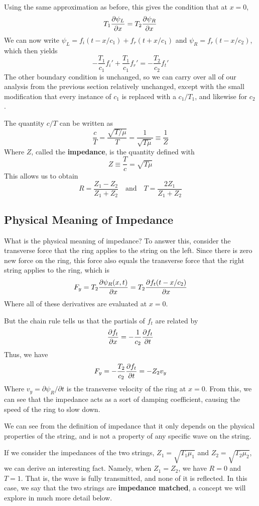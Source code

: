 Using the same approximation as before, this gives the condition that at $x=0$,
\[ T_1\pdv{\psi_L}{x} = T_2\pdv{\psi_R}{x} \]
We can now write $\psi_L = f_i(t - x/c_1) + f_r(t + x/c_1)$ and $\psi_R = f_r(t - x/c_2)$, which then yields
\[ -\frac{T_1}{c_1} f_i' + \frac{T_1}{c_1}f_r' = -\frac{T_2}{c_2}f_t'\]
The other boundary condition is unchanged, so we can carry over all of our analysis from the previous section relatively unchanged, except with the small modification that every instance of $c_1$ is replaced with a $c_1/T_1$, and likewise for $c_2$.

The quantity $c/T$ can be written as 
\[ \frac{c}{T} = \frac{\sqrt{T/\mu }}{T} = \frac{1}{\sqrt{T\mu}} \equiv \frac{1}{Z}\]
Where $Z$, called the \textbf{impedance}, is the quantity defined with
\[ Z \equiv \frac{T}{c} = \sqrt{T\mu} \]
This allows us to obtain
\[ R = \frac{Z_1-Z_2}{Z_1+Z_2} \quad\text{and}\quad T = \frac{2Z_1}{Z_1+Z_2}\]
\subsection*{Physical Meaning of Impedance}
What is the physical meaning of impedance? To answer this, consider the transverse force that the ring applies to the string on the left. Since there is zero new force on the ring, this force also equals the transverse force that the right string applies to the ring, which is
\[ F_y = T_2 \pdv{\psi_R(x,t)}{x} = T_2\pdv{f_t(t-x/c_2)}{x} \]
Where all of these derivatives are evaluated at $x=0$.

But the chain rule tells us that the partials of $f_t$ are related by
\[ \pdv{f_t}{x} = -\frac{1}{c_2} \pdv{f_t}{t} \]
Thus, we have
\[ F_y = -\frac{T_2}{c_2} \pdv{f_t}{t} = -Z_2v_y\]
Where $v_y = \partial \psi_R/\partial t$ is the transverse velocity of the ring at $x=0$. From this, we can see that the impedance acts as a sort of damping coefficient, causing the speed of the ring to slow down.

We can see from the definition of impedance that it only depends on the physical properties of the string, and is not a property of any specific wave on the string.

If we consider the impedances of the two strings, $Z_1 = \sqrt{T_1\mu_1}$ and $Z_2 = \sqrt{T_2\mu_2}$, we can derive an interesting fact. Namely, when $Z_1=Z_2$, we have $R=0$ and $T=1$. That is, the wave is fully transmitted, and none of it is reflected. In this case, we say that the two strings are \textbf{impedance matched}, a concept we will explore in much more detail below.

